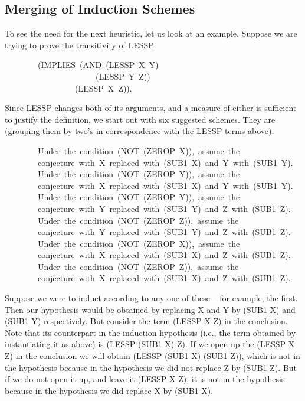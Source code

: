 \documentclass[11pt]{book}
\newenvironment{pubasis}{\begin{flushleft}\ttfamily\small}{\normalsize\rmfamily\end{flushleft}}
\newcommand{\pubdefaulttextsize}{\large}
\begin{document}
\subsection{Merging of Induction Schemes}
\pubdefaulttextsize
To see the need for the next heuristic, let us look at an
example.  Suppose we are trying to prove the transitivity of LESSP:
\begin{pubasis}
~~~~~~~~(IMPLIES~(AND~(LESSP~X~Y)\\
~~~~~~~~~~~~~~~~~~~~~~(LESSP~Y~Z))\\
~~~~~~~~~~~~~~~~~(LESSP~X~Z)).\\
\end{pubasis}
Since LESSP changes both of its arguments, and a measure of either is sufficient to
justify the definition, we start out with six suggested schemes.
They are (grouping them by two's in correspondence with the
LESSP terms above):
\begin{pubasis}
~~~~~~~~Under~the~condition~(NOT~(ZEROP~X)),~assume~the\\
~~~~~~~~conjecture~with~X~replaced~with~(SUB1~X)~and~Y~with~(SUB1~Y).\\

~~~~~~~~Under~the~condition~(NOT~(ZEROP~Y)),~assume~the\\
~~~~~~~~conjecture~with~X~replaced~with~(SUB1~X)~and~Y~with~(SUB1~Y).\\

~~~~~~~~Under~the~condition~(NOT~(ZEROP~Y)),~assume~the\\
~~~~~~~~conjecture~with~Y~replaced~with~(SUB1~Y)~and~Z~with~(SUB1~Z).\\

~~~~~~~~Under~the~condition~(NOT~(ZEROP~Z)),~assume~the\\
~~~~~~~~conjecture~with~Y~replaced~with~(SUB1~Y)~and~Z~with~(SUB1~Z).\\

~~~~~~~~Under~the~condition~(NOT~(ZEROP~X)),~assume~the\\
~~~~~~~~conjecture~with~X~replaced~with~(SUB1~X)~and~Z~with~(SUB1~Z).\\

~~~~~~~~Under~the~condition~(NOT~(ZEROP~Z)),~assume~the\\
~~~~~~~~conjecture~with~X~replaced~with~(SUB1~X)~and~Z~with~(SUB1~Z).\\
\end{pubasis}
Suppose we were to induct according to any one of these -- for
example, the first.  Then our hypothesis would be obtained by replacing
X and Y by (SUB1 X) and (SUB1 Y) respectively.  But consider
the term (LESSP X Z) in the conclusion.  Note that its counterpart in the
induction hypothesis (i.e., the term obtained by instantiating
it as above) is (LESSP (SUB1 X) Z).  If we open  up the (LESSP X Z) in the conclusion
we will obtain (LESSP (SUB1 X) (SUB1 Z)), which is not in the hypothesis
because in the hypothesis we did not replace Z by (SUB1 Z).  But if we do not open
it up, and leave it (LESSP X Z), it is not in the hypothesis because in the hypothesis we
did replace X by (SUB1 X).
\end{document}
